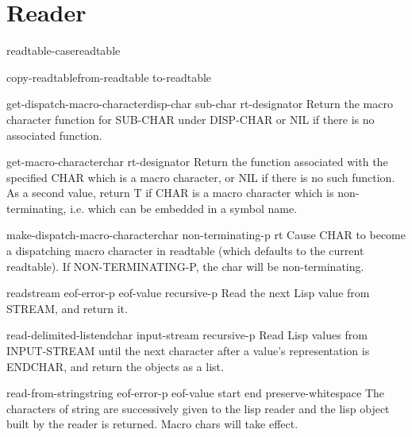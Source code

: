 \section{Reader}

\begin{accessor}{readtable-case}{readtable}{}{}
  
\end{accessor}

\begin{function}{copy-readtable}{\op from-readtable to-readtable}{}{}
  
\end{function}

\begin{function}{get-dispatch-macro-character}{disp-char sub-char \op rt-designator}{}{}
  Return the macro character function for SUB-CHAR under DISP-CHAR
   or NIL if there is no associated function.
\end{function}

\begin{function}{get-macro-character}{char \op rt-designator}{}{}
  Return the function associated with the specified CHAR which is a macro
  character, or NIL if there is no such function. As a second value, return
  T if CHAR is a macro character which is non-terminating, i.e. which can
  be embedded in a symbol name.
\end{function}

\begin{function}{make-dispatch-macro-character}{char \op non-terminating-p rt}{}{}
  Cause CHAR to become a dispatching macro character in readtable (which
   defaults to the current readtable). If NON-TERMINATING-P, the char will
   be non-terminating.
\end{function}

\begin{function}{read}{\op stream eof-error-p eof-value recursive-p}{}{}
  Read the next Lisp value from STREAM, and return it.
\end{function}

\begin{function}{read-delimited-list}{endchar \op input-stream recursive-p}{}{}
  Read Lisp values from INPUT-STREAM until the next character after a
   value's representation is ENDCHAR, and return the objects as a list.
\end{function}

\begin{function}{read-from-string}{string \op eof-error-p eof-value \key start end preserve-whitespace}{}{}
  The characters of string are successively given to the lisp reader
   and the lisp object built by the reader is returned. Macro chars
   will take effect.
\end{function}

